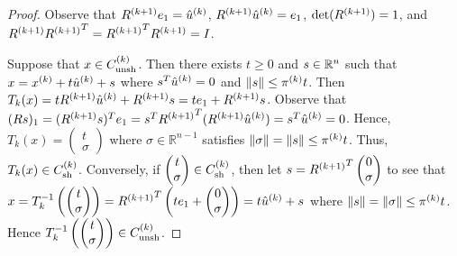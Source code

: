 \begin{proof}

Observe that ${R^{(k+1)}} e_1 = {{{\hat u}^{(k)}}}$, ${R^{(k+1)}} {{{\hat u}^{(k)}}} = e_1$, $\det({R^{(k+1)}}) = 1$, and 
${R^{(k+1)}} {R^{(k+1)}} ^T = {R^{(k+1)}} ^T{R^{(k+1)}} = I$.

Suppose that $x \in {C^{(k)}_{\textrm{unsh}}}$.
Then there exists $t \ge 0$ and $s \in \mathbb R^n$ such that $x = x^{(k)} + t {{{\hat u}^{(k)}}}+ s$ where $s^T {{{\hat u}^{(k)}}} = 0$ and $\|s\| \le {\pi^{(k)}} t$.
Then $T_k(x) = t{R^{(k+1)}}{{{\hat u}^{(k)}}} + {R^{(k+1)}} s = te_1 + {R^{(k+1)}} s$.
Observe that $(Rs)_1 = ({R^{(k+1)}} s)^Te_1 = s^T{R^{(k+1)}}^T({R^{(k+1)}} {{{\hat u}^{(k)}}}) = s^T {{{\hat u}^{(k)}}} = 0$.
Hence,
$T_k(x) = \begin{pmatrix}
t \\
\sigma
\end{pmatrix}$ where $\sigma \in \mathbb R ^ {n-1}$ satisfies $\|\sigma\| = \|s\| \le \pi^{(k)} t$.
Thus, $T_k(x) \in {C^{(k)}_{\textrm{sh}}}$.
Conversely, if $\begin{pmatrix}
t \\
\sigma
\end{pmatrix} \in {C^{(k)}_{\textrm{sh}}}$, then let
$s = {R^{(k+1)}}^T\begin{pmatrix}
0 \\
\sigma
\end{pmatrix}$
to see that
$x = T_k^{-1}\left(\begin{pmatrix}
t \\
\sigma
\end{pmatrix} \right)= {R^{(k+1)}}^T\left(t e_1 + \begin{pmatrix}
0 \\
\sigma
\end{pmatrix}\right) = t {{{\hat u}^{(k)}}} + s$ where 
$\|s\| = \|\sigma\| \le \pi^{(k)} t$.
Hence $T_k^{-1}\left(\begin{pmatrix}
t \\
\sigma
\end{pmatrix}\right) \in {C^{(k)}_{\textrm{unsh}}}$.
\end{proof}




